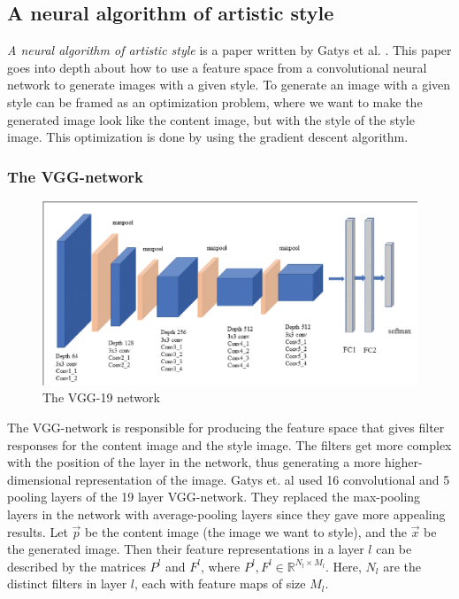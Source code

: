 \subsection{A neural algorithm of artistic style}
\textit{A neural algorithm of artistic style} is a paper written by Gatys et al. \cite{Gatys:1}. This paper goes into depth about how to use a feature space from a convolutional neural network to generate images with a given style. To generate an image with a given style can be framed as an optimization problem, where we want to make the generated image look like the content image, but with the style of the style image. This optimization is done by using the gradient descent algorithm.
\subsubsection{The VGG-network}
\begin{figure}[!ht]
\begin{center}
\includegraphics[scale=0.30]{report/Background/images/vgg19.png}
\caption{The VGG-19 network}
\label{fig:rotasjon}
\end{center}
\end{figure}
The VGG-network is responsible for producing the feature space that gives filter responses for the content image and the style image. The filters get more complex with the position of the layer in the network, thus generating a more higher-dimensional representation of the image. Gatys et. al used 16 convolutional and 5 pooling layers of the 19 layer VGG-network. They replaced the max-pooling layers in the network with average-pooling layers since they gave more appealing results. \newline\newline
Let $\vec{p}$ be the content image (the image we want to style), and the $\vec{x}$ be the generated image. Then their feature representations in a layer $l$ can be described by the matrices $P^l$ and $F^l$, where $P^l, F^l\in\mathbb{R}^{N_l\times M_l}$. Here, $N_l$ are the distinct filters in layer $l$, each with feature maps of size $M_l$. 
